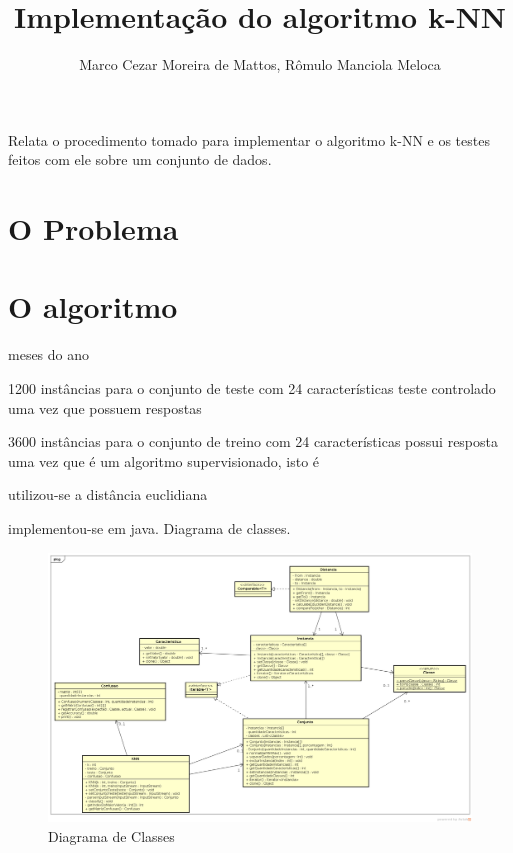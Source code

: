 \documentclass[12pt]{article}
\title{Implementação do algoritmo k-NN}
\author{Marco Cezar Moreira de Mattos\inst{1}, Rômulo Manciola Meloca\inst{1}}
\begin{document}
	\maketitle

	\begin{resumo}
		Relata o procedimento tomado para implementar o algoritmo k-NN e os testes feitos com ele sobre um conjunto de dados.
	\end{resumo}

	\section{O Problema}\label{sec:problema}
		

	\section{O algoritmo}\label{sec:algoritmo}


		meses do ano

		1200 instâncias para o conjunto de teste com 24 características
		teste controlado uma vez que possuem respostas

		3600 instâncias para o conjunto de treino com 24 características
		possui resposta uma vez que é um algoritmo supervisionado, isto é

		utilizou-se a distância euclidiana

		implementou-se em java.
		Diagrama de classes.

		\begin{landscape}
		\centering
		\begin{figure}[p]
		\includegraphics[width=1.4\textwidth]{classDiagram.png}
		\caption{Diagrama de Classes}
		\label{fig:classDiagram}
		\end{figure}
		\end{landscape}
		\restoregeometry
\end{document}
